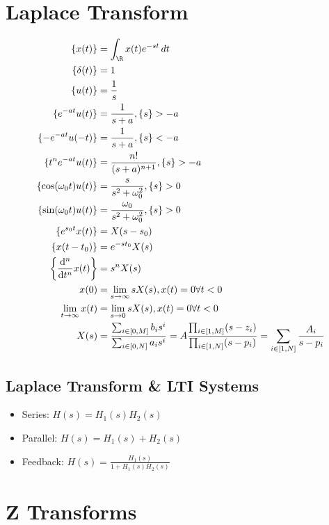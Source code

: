 \documentclass{article}
\let\Re\relax
\DeclareMathOperator{\Re}{\mathfrak{R}}
\let\L\relax
\DeclareMathOperator{\L}{\mathcal{L}}
\begin{document}
\section{Laplace Transform}

\begin{align}
    \L\{x(t)\} &= \int_{\R} x(t) e^{-st} \, dt \\
    \L\{\delta(t)\} &= 1 \\
    \L\{u(t)\} &= \frac{1}{s} \\
    \L\{e^{-at} u(t)\} &= \frac{1}{s + a}, \Re\{s\} > -a \\
    \L\{-e^{-at} u(-t)\} &= \frac{1}{s + a}, \Re\{s\} < -a \\
    \L\{t^n e^{-at} u(t)\} &= \frac{n!}{(s + a)^{n + 1}}, \Re\{s\} > -a \\
    \L\{\cos(\omega_0 t) u(t)\} &= \frac{s}{s^2 + \omega_0^2}, \Re\{s\} > 0 \\
    \L\{\sin(\omega_0 t) u(t)\} &= \frac{\omega_0}{s^2 + \omega_0^2}, \Re\{s\} > 0 \\
    \L\{e^{s_0 t} x(t)\} &= X(s - s_0) \\
    \L\{x(t - t_0)\} &= e^{-s t_0} X(s) \\
    \L\qty{\dv[n]{t} x(t)} &= s^n X(s) \\
    x(0) &= \lim_{s \to \infty} s X(s), x(t) = 0 \forall t < 0 \\
    \lim_{t \to \infty} x(t) &= \lim_{s \to 0} s X(s), x(t) = 0 \forall t < 0 \\
    X(s) &= \frac{\sum_{i \in [0, M]} b_i s^i}{\sum_{i \in [0, N]} a_i s^i} = A \frac{\prod_{i \in [1, M]} (s - z_i)}{\prod_{i \in [1, N]} (s - p_i)} = \sum_{i \in [1, N]} \frac{A_i}{s - p_i}
\end{align}

\subsection{Laplace Transform \& LTI Systems}

\begin{itemize}
    \item Series: \(H(s) = H_1(s) H_2(s)\)
    \item Parallel: \(H(s) = H_1(s) + H_2(s)\)
    \item Feedback: \(H(s) = \frac{H_1(s)}{1 + H_1(s) H_2(s)}\)
\end{itemize}

\section{Z Transforms}
\end{document}
